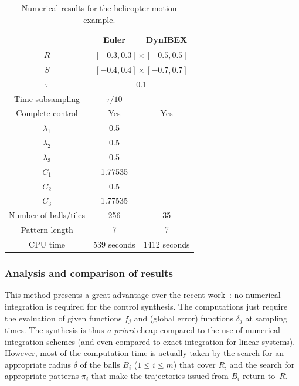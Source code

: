  \begin{table}[ht]
 \centering
\begin{tabular}{|c|c|c|}
   \hline 
   &\multicolumn{1}{c|}{Euler} & \multicolumn{1}{c|}{DynIBEX} \\
   \hline
   $R$ & \multicolumn{2}{c|}{$[-0.3,0.3]\times[-0.5,0.5]$} \\
   $S$ & \multicolumn{2}{c|}{$[-0.4,0.4]\times[-0.7,0.7]$} \\   
\hline
$\tau$ & \multicolumn{2}{c|}{0.1} \\
\hline
Time subsampling & $\tau/10$ & \\   
   \hline
 Complete control & Yes  & Yes \\
\hline
$\lambda_1$  & 0.5    &        \\
$\lambda_2$  &  0.5 &\\
$\lambda_3$  &  0.5 &  \\
$C_{1}$  &  1.77535 &                     \\
$C_{2}$ & 0.5 &\\
$C_{3}$  &   1.77535& \\
\hline
Number of balls/tiles & 256 & 35 \\
Pattern length & 7 & 7 \\
\hline
CPU time &  539 seconds & 1412 seconds\\ \hline
  \end{tabular}
\label{table:HM}
\caption{Numerical results for the helicopter motion example.}
 \end{table} 

 

\subsubsection{Analysis and comparison of results}


This method presents a great advantage over the recent work~\cite{le2016control}:
no numerical integration is required for the control synthesis. 
The computations just require the evaluation of given 
functions $f_j$ and
(global error) functions $\delta_j$ at sampling times. The synthesis 
is thus 
{\em a priori} cheap compared to the use of numerical integration schemes (and even compared to
exact integration for linear systems).
However, most of the computation time is actually taken by the search
for an appropriate radius $\delta$
of the balls $B_i$ ($1\leq i\leq m$) that cover $R$, and the search for appropriate 
patterns $\pi_i$ that make the trajectories issued from $B_i$ return to~$R$.


